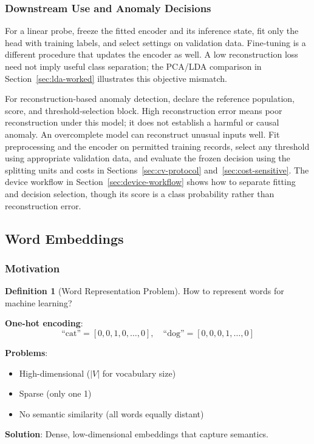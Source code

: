 \documentclass[11pt,twoside]{article}
\numberwithin{equation}{section}
\theoremstyle{plain}
\theoremstyle{definition}
\newtheorem{definition}[theorem]{Definition}
\theoremstyle{remark}
\begin{document}
\subsubsection{Downstream Use and Anomaly Decisions}
For a linear probe, freeze the fitted encoder and its inference state, fit
only the head with training labels, and select settings on validation data.
Fine-tuning is a different procedure that updates the encoder as well.
A low reconstruction loss need not imply useful class separation; the PCA/LDA
comparison in Section~\ref{sec:lda-worked} illustrates this objective mismatch.

For reconstruction-based anomaly detection, declare the reference population,
score, and threshold-selection block. High reconstruction error means poor
reconstruction under this model; it does not establish a harmful or causal
anomaly. An overcomplete model can reconstruct unusual inputs well. Fit
preprocessing and the encoder on permitted training records, select any
threshold using appropriate validation data, and evaluate the frozen decision
using the splitting units and costs in Sections~\ref{sec:cv-protocol}
and~\ref{sec:cost-sensitive}. The device workflow in
Section~\ref{sec:device-workflow} shows how to separate fitting and decision
selection, though its score is a class probability rather than reconstruction
error.

\subsection{Word Embeddings}

\subsubsection{Motivation}

\begin{definition}[Word Representation Problem]
How to represent words for machine learning?

\textbf{One-hot encoding}:
\[
\text{``cat''} = [0, 0, 1, 0, \ldots, 0], \quad \text{``dog''} = [0, 0, 0, 1, \ldots, 0]
\]

\textbf{Problems}:
\begin{itemize}
\item High-dimensional ($|V|$ for vocabulary size)
\item Sparse (only one 1)
\item No semantic similarity (all words equally distant)
\end{itemize}

\textbf{Solution}: Dense, low-dimensional embeddings that capture semantics.
\end{definition}
\end{document}
